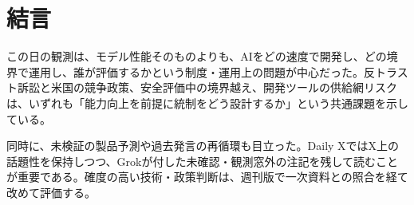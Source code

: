 \section*{結言}
この日の観測は、モデル性能そのものよりも、AIをどの速度で開発し、どの境界で運用し、誰が評価するかという制度・運用上の問題が中心だった。反トラスト訴訟と米国の競争政策、安全評価中の境界越え、開発ツールの供給網リスクは、いずれも「能力向上を前提に統制をどう設計するか」という共通課題を示している。

同時に、未検証の製品予測や過去発言の再循環も目立った。Daily XではX上の話題性を保持しつつ、Grokが付した未確認・観測窓外の注記を残して読むことが重要である。確度の高い技術・政策判断は、週刊版で一次資料との照合を経て改めて評価する。
